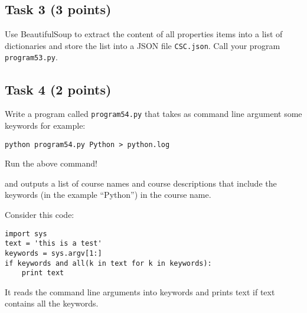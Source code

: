 \documentclass[12pt]{article}
\begin{document}
\subsection{Task 3 (3 points)}

\noindent Use BeautifulSoup to extract the content of all properties items into a list of dictionaries and store the list into a JSON file {\tt CSC.json}. Call your program {\tt program53.py}.

\subsection{Task 4 (2 points)}

\noindent Write a program called {\tt program54.py} that takes as command line argument some keywords for example:

\begin{verbatim}
python program54.py Python > python.log
\end{verbatim}

Run the above command!

\noindent and outputs a list of course names and course descriptions that include the keywords (in the example ``Python'') in the course name. 

 Consider this code:

\begin{verbatim} 
import sys
text = 'this is a test'
keywords = sys.argv[1:]
if keywords and all(k in text for k in keywords):
    print text
\end{verbatim}

\noindent It reads the command line arguments into keywords and prints text if text contains all the keywords.
\end{document}
